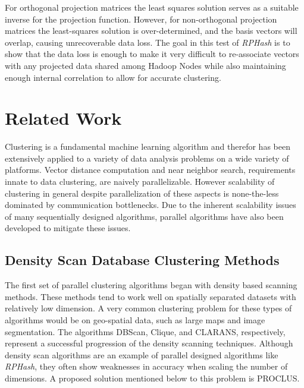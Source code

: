 \documentclass[a4paper,10pt]{article}
\begin{document}
For orthogonal projection matrices the least squares solution serves as a
suitable inverse for the projection function.  However, for non-orthogonal
projection matrices the least-squares solution is over-determined, and the
basis vectors will overlap, causing unrecoverable data loss.  The goal in
this test of \emph{RPHash} is to show that the data loss is enough to make
it very difficult to re-associate vectors with any projected data shared
among Hadoop Nodes while also maintaining enough internal correlation to
allow for accurate clustering.

\section{Related Work} Clustering is a fundamental machine learning algorithm
and therefor has been extensively applied to a variety of data analysis
problems on a wide variety of platforms.  Vector distance computation and
near neighbor search, requirements innate to data clustering, are naively
parallelizable.  However scalability of clustering in general despite
parallelization of these aspects is none-the-less dominated by communication
bottlenecks.  Due to the inherent scalability issues of many sequentially
designed algorithms, parallel algorithms have also been developed to mitigate
these issues.  \subsection{Density Scan Database Clustering Methods}
The first set of parallel clustering algorithms began with density based
scanning methods.  These methods tend to work well on spatially separated
datasets with relatively low dimension.  A very common clustering problem for
these types of algorithms would be on geo-spatial data, such as large maps and
image segmentation.  The algorithms DBScan\cite{dbscan}, Clique\cite{clique},
and CLARANS\cite{Clarans}, respectively, represent a successful progression
of the density scanning techniques.  Although density scan algorithms are an
example of parallel designed algorithms like \emph{RPHash}, they often show
weaknesses in accuracy when scaling the number of dimensions.  A proposed
solution mentioned below to this problem is PROCLUS\cite{Proclus}.
\end{document}
